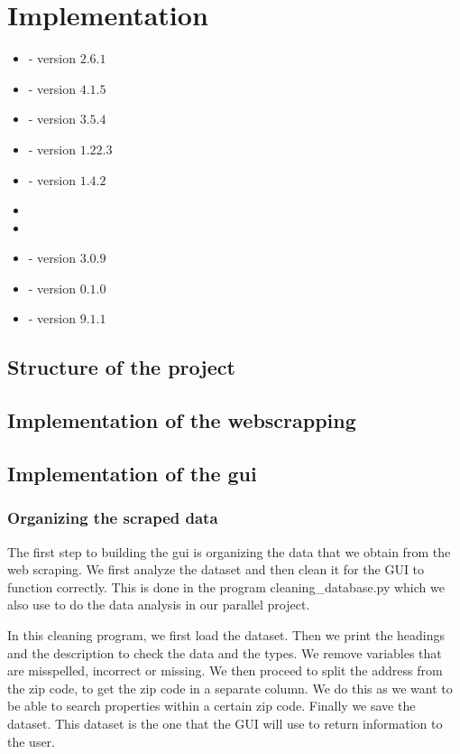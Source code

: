 \documentclass[main]{subfiles}
\begin{document}
\section{Implementation}
\begin{itemize}
    \item \pkg[Scrapy] -  version $2.6.1$
    \item \pkg[Selenium] - version $4.1.5$
    \item {} - version $3.5.4$
    \item \pkg[Numpy] -  version $1.22.3$
    \item \pkg[Pandas]  - version $1.4.2$
    \item \pkg[Time]
    \item \pkg[Datetime]
    \item \pkg[Openpyxl] - version $3.0.9$
    \item \pkg[Tk (tkinter)] - version $0.1.0$
    \item \pkg[Pillow] - version $9.1.1$
\end{itemize}

\subsection{Structure of the project}

\subsection{Implementation of the webscrapping}

\subsection{Implementation of the \ac{gui}}

\subsubsection{Organizing the scraped data}
The first step to building the \ac{gui} is organizing the data that we obtain from the web scraping.
We first analyze the dataset and then clean it for the GUI to function correctly.
This is done in the program cleaning\_database.py which we also use to do the data analysis in our parallel project. \par
In this cleaning program, we first load the dataset. 
Then we print the headings and the description to check the data and the types.
We remove variables that are misspelled, incorrect or missing. 
We then proceed to split the address from the zip code, to get the zip code in a separate column. 
We do this as we want to be able to search properties within a certain zip code. 
Finally we save the dataset. This dataset is the one that the GUI will use to return information to the user.
\end{document}
